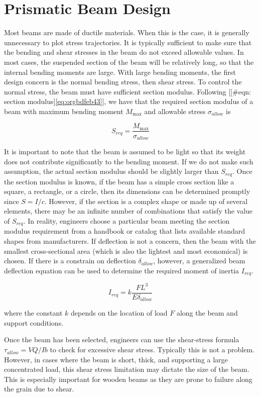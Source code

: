 \documentclass[a4paper,openany,12pt]{book}
\begin{document}
{{\section{Prismatic Beam Design}
\label{sec:orgbf1aa26}
Most beams are made of ductile materials. When this is the case, it is
generally unnecessary to plot stress trajectories. It is typically
sufficient to make sure that the bending and shear stresses in the beam
do not exceed allowable values. In most cases, the suspended section of
the beam will be relatively long, so that the internal bending moments
are large. With large bending moments, the first design concern is the
normal bending stress, then shear stress. To control the normal stress,
the beam must have sufficient section modulus. Following
[[\#eqn: section modulus]\ref{eq:orgbdfeb43}], we have that the
required section modulus of a beam with maximum bending moment
\(M_{\max}\) and allowable stress \(\sigma_{allow}\) is

$$S_{req} = \frac{M_{\max}}{\sigma_{allow}}$$

It is important to note that the beam is assumed to be light so that its
weight does not contribute significantly to the bending moment. If we do
not make such assumption, the actual section modulus should be slightly
larger than \(S_{req}\). Once the section modulus is known, if the beam
has a simple cross section like a square, a rectangle, or a circle, then
its dimensions can be determined promptly since \(S = I/c\). However, if
the section is a complex shape or made up of several elements, there may
be an infinite number of combinations that satisfy the value of
\(S_{req}\). In reality, engineers choose a particular beam meeting the
section modulus requirement from a handbook or catalog that lists
available standard shapes from manufacturers. If deflection is not a
concern, then the beam with the smallest cross-sectional area (which is
also the lightest and most economical) is chosen. If there is a
constrain on deflection \(\delta_{allow}\), however, a generalized beam
deflection equation can be used to determine the required moment of
inertia \(I_{req}\).

$$I_{req} = k \frac{FL^3}{E \delta_{allow}}$$

where the constant \(k\) depends on the location of load \(F\) along the
beam and support conditions.

Once the beam has been selected, engineers can use the shear-stress
formula \(\tau_{allow} = VQ/Ib\) to check for excessive shear stress.
Typically this is not a problem. However, in cases where the beam is
short, thick, and supporting a large concentrated load, this shear
stress limitation may dictate the size of the beam. This is especially
important for wooden beams as they are prone to failure along the grain
due to shear.

}}
\end{document}

